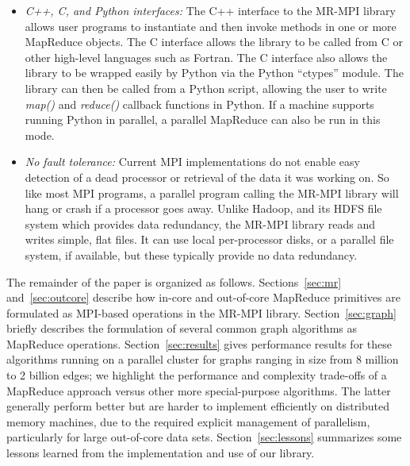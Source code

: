 \begin{itemize}
\item {\it C++, C, and Python interfaces:} The C++ interface to the
MR-MPI library allows user programs to instantiate and then invoke
methods in one or more MapReduce objects.  The C interface allows the
library to be called from C or other high-level languages such as
Fortran.  The C interface also allows the library to be wrapped easily
by Python via the Python ``ctypes'' module.  The library can then be
called from a Python script, allowing the user to write {\it map()} and
{\it reduce()} callback functions in Python.  If a machine supports running
Python in parallel, a parallel MapReduce can also be run in this mode.

\item {\it No fault tolerance:} Current MPI implementations do not enable
easy detection of a dead processor or retrieval of the data it was
working on.  So like most MPI programs, a parallel program calling the
MR-MPI library will hang or crash if a processor goes away.  Unlike
Hadoop, and its HDFS file system which provides data redundancy,
the MR-MPI library reads and writes simple, flat files.  It can
use local per-processor disks, or a parallel file system, if
available, but these typically provide no data redundancy.

\end{itemize}

The remainder of the paper is organized as follows.  
Sections~\ref{sec:mr} and~\ref{sec:outcore} describe how in-core and
out-of-core MapReduce primitives are formulated as MPI-based
operations in the MR-MPI library.  Section~\ref{sec:graph} briefly
describes the formulation of several common graph algorithms as
MapReduce operations.  Section~\ref{sec:results} gives performance
results for these algorithms running on a parallel cluster for graphs
ranging in size from 8 million to 2 billion edges;  
we highlight the performance and complexity trade-offs
of a MapReduce approach versus other more special-purpose algorithms.
The latter generally perform better but are harder to implement
efficiently on distributed memory machines, due to the required
explicit management of parallelism, particularly for large out-of-core
data sets.  Section~\ref{sec:lessons} summarizes some lessons learned
from the implementation and use of our library.
